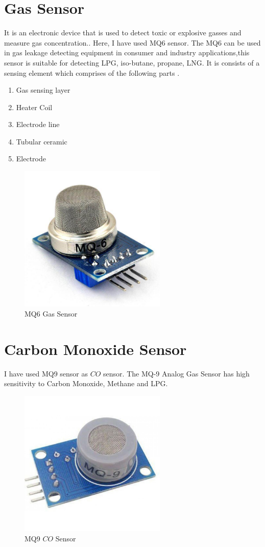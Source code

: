 \section{Gas Sensor}
It is an electronic device that is used to detect toxic or explosive gasses and measure gas concentration.. Here, I have used MQ6 sensor. The MQ6 can be used in gas leakage detecting equipment in consumer and industry applications,this sensor is suitable for detecting LPG, iso-butane, propane, LNG. It is consists of a sensing element which comprises of the following parts \cite{evalina2020use}.
\begin{enumerate}[i]
    \item Gas sensing layer
    \item Heater Coil
    \item Electrode line
    \item Tubular ceramic
    \item Electrode
\end{enumerate}
\begin{figure} [h!]
\centering
 \includegraphics[width=7cm]{Results/MQ6.jpg}
 \caption[]{MQ6 Gas Sensor}
    \label{}
\end{figure}
\section{Carbon Monoxide Sensor}
I have used MQ9 sensor as $CO$ sensor. The MQ-9 Analog Gas Sensor has high sensitivity to Carbon Monoxide, Methane and LPG.\cite{setiawan2018iot}
\begin{figure} [h!]
\centering
 \includegraphics[width=7cm]{Results/mq9.jpg}
 \caption[]{MQ9 $CO$ Sensor}
    \label{}
\end{figure}

